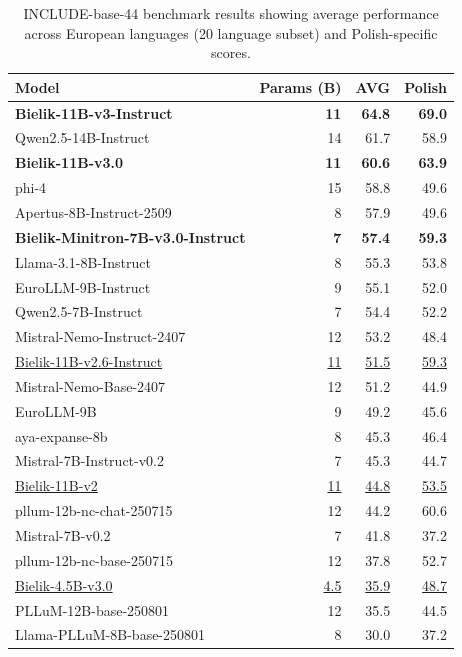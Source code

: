 \documentclass{article}
\begin{document}
\begin{table}[t]
  \centering
  \small
  \begin{tabular}{lrrr}
  \toprule
  \textbf{Model} & \textbf{Params (B)} & \textbf{AVG} & \textbf{Polish} \\
  \midrule
  \textbf{Bielik-11B-v3-Instruct} & \textbf{11} & \textbf{64.8} & \textbf{69.0} \\
  Qwen2.5-14B-Instruct & 14 & 61.7 & 58.9 \\
  \textbf{Bielik-11B-v3.0} & \textbf{11} & \textbf{60.6} & \textbf{63.9} \\
  phi-4 & 15 & 58.8 & 49.6 \\
  Apertus-8B-Instruct-2509 & 8 & 57.9 & 49.6 \\
  \textbf{Bielik-Minitron-7B-v3.0-Instruct} & \textbf{7} & \textbf{57.4} & \textbf{59.3} \\
  Llama-3.1-8B-Instruct & 8 & 55.3 & 53.8 \\
  EuroLLM-9B-Instruct & 9 & 55.1 & 52.0 \\
  Qwen2.5-7B-Instruct & 7 & 54.4 & 52.2 \\
  Mistral-Nemo-Instruct-2407 & 12 & 53.2 & 48.4 \\
  \underline{Bielik-11B-v2.6-Instruct} & \underline{11} & \underline{51.5} & \underline{59.3} \\
  Mistral-Nemo-Base-2407 & 12 & 51.2 & 44.9 \\
  EuroLLM-9B & 9 & 49.2 & 45.6 \\
  aya-expanse-8b & 8 & 45.3 & 46.4 \\
  Mistral-7B-Instruct-v0.2 & 7 & 45.3 & 44.7 \\
  \underline{Bielik-11B-v2} & \underline{11} & \underline{44.8} & \underline{53.5} \\
  pllum-12b-nc-chat-250715 & 12 & 44.2 & 60.6 \\
  Mistral-7B-v0.2 & 7 & 41.8 & 37.2 \\
  pllum-12b-nc-base-250715 & 12 & 37.8 & 52.7 \\
  \underline{Bielik-4.5B-v3.0} & \underline{4.5} & \underline{35.9} & \underline{48.7} \\
  PLLuM-12B-base-250801 & 12 & 35.5 & 44.5 \\
  Llama-PLLuM-8B-base-250801 & 8 & 30.0 & 37.2 \\
  \bottomrule
  \end{tabular}
  \caption{INCLUDE-base-44 benchmark results showing average performance across European languages (20 language subset) and Polish-specific scores.}
  \label{tab:include-base-44}
\end{table}
\end{document}
